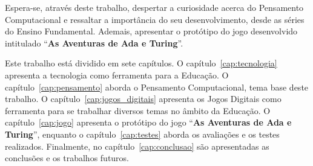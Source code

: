 Espera-se, através deste trabalho, despertar a curiosidade acerca do Pensamento Computacional e ressaltar a importância do seu desenvolvimento, desde as séries do Ensino Fundamental. Ademais, apresentar o protótipo do jogo desenvolvido intitulado “\textbf{As Aventuras de Ada e Turing}”.

Este trabalho está dividido em sete capítulos. O capítulo~\ref{cap:tecnologia} apresenta a tecnologia como ferramenta para a Educação. O capítulo~\ref{cap:pensamento} aborda o Pensamento Computacional, tema base deste trabalho. O capítulo~\ref{cap:jogos_digitais} apresenta os Jogos Digitais como ferramenta para se trabalhar diversos temas no âmbito da Educação. O capítulo~\ref{cap:jogo} apresenta o protótipo do jogo “\textbf{As Aventuras de Ada e Turing}”, enquanto o capítulo~\ref{cap:testes} aborda os avaliações e os testes realizados. Finalmente, no capítulo~\ref{cap:conclusao} são apresentadas as conclusões e os trabalhos futuros.